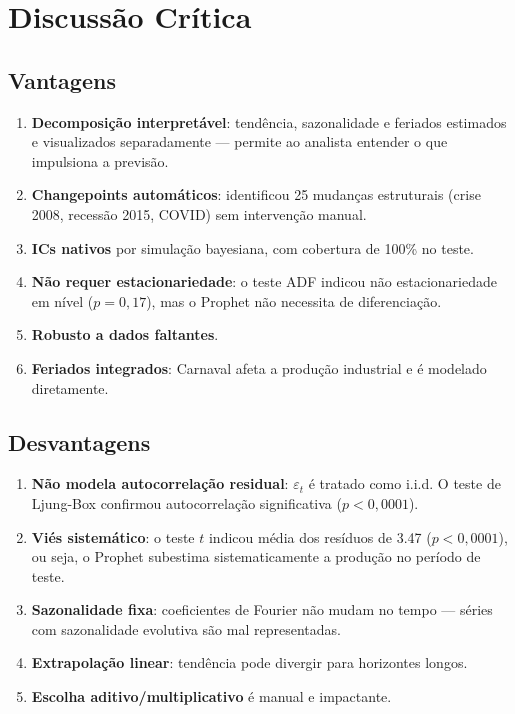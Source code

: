 \documentclass[12pt, a4paper]{article}
\begin{document}
\section{Discussão Crítica}

\subsection{Vantagens}
\begin{enumerate}[nosep, leftmargin=*]
    \item \textbf{Decomposição interpretável}: tendência,
    sazonalidade e feriados estimados e visualizados separadamente
    --- permite ao analista entender o que impulsiona a previsão.
    \item \textbf{Changepoints automáticos}: identificou 25 mudanças
    estruturais (crise 2008, recessão 2015, COVID) sem
    intervenção manual.
    \item \textbf{ICs nativos} por simulação bayesiana, com
    cobertura de 100\% no teste.
    \item \textbf{Não requer estacionariedade}: o teste ADF
    indicou não estacionariedade em nível ($p = 0{,}17$), mas o
    Prophet não necessita de diferenciação.
    \item \textbf{Robusto a dados faltantes}.
    \item \textbf{Feriados integrados}: Carnaval afeta a produção
    industrial e é modelado diretamente.
\end{enumerate}

\subsection{Desvantagens}
\begin{enumerate}[nosep, leftmargin=*]
    \item \textbf{Não modela autocorrelação residual}:
    $\varepsilon_t$ é tratado como i.i.d. O teste de Ljung-Box
    confirmou autocorrelação significativa ($p < 0{,}0001$).
    \item \textbf{Viés sistemático}: o teste $t$ indicou média
    dos resíduos de 3.47 ($p < 0{,}0001$), ou seja, o Prophet
    subestima sistematicamente a produção no período de teste.
    \item \textbf{Sazonalidade fixa}: coeficientes de Fourier não
    mudam no tempo --- séries com sazonalidade evolutiva são mal
    representadas.
    \item \textbf{Extrapolação linear}: tendência pode divergir
    para horizontes longos.
    \item \textbf{Escolha aditivo/multiplicativo} é manual e
    impactante.
\end{enumerate}
\end{document}
